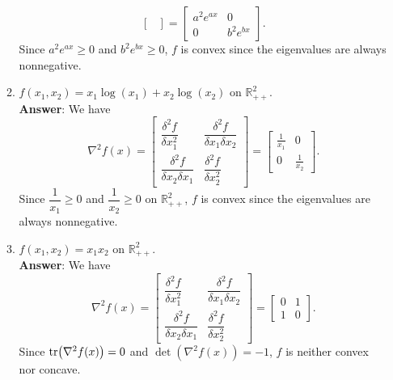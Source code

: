 \documentclass{article}
\begin{document}
\begin{enumerate}
\begin{enumerate}
\[\begin{bmatrix}
                              \end{bmatrix}=\begin{bmatrix}
                                    a^2e^{ax} & 0         \\
                                    0         & b^2e^{bx}
                              \end{bmatrix}.
                        \] Since $a^2e^{ax}\geq 0$ and $b^2e^{bx}\geq 0$, $f$ is convex since the eigenvalues are always nonnegative.
                  \item $f(x_1,x_2)=x_1\log(x_1)+x_2\log(x_2)$ on $\mathbb{R}_{++}^2$.\\
                        \textbf{Answer}: We have \[
                              \nabla^2 f(x)=\begin{bmatrix}
                                    \dfrac{\delta^2 f}{\delta x_1^2} & \dfrac{\delta^2 f}{\delta x_1\delta x_2} \\\dfrac{\delta^2 f}{\delta x_2\delta x_1}&\dfrac{\delta^2 f}{\delta x_2^2}
                              \end{bmatrix}=\begin{bmatrix}
                                    \frac{1}{x_1} & 0             \\
                                    0             & \frac{1}{x_2}
                              \end{bmatrix}.
                        \] Since $\dfrac{1}{x_1}\geq 0$ and $\dfrac{1}{x_2}\geq 0$ on $\mathbb{R}_{++}^2$, $f$ is convex since the eigenvalues are always nonnegative.
                  \item $f(x_1,x_2)=x_1x_2$ on $\mathbb{R}_{++}^2$.\\
                        \textbf{Answer}: We have \[
                              \nabla^2 f(x)=\begin{bmatrix}
                                    \dfrac{\delta^2 f}{\delta x_1^2} & \dfrac{\delta^2 f}{\delta x_1\delta x_2} \\\dfrac{\delta^2 f}{\delta x_2\delta x_1}&\dfrac{\delta^2 f}{\delta x_2^2}
                              \end{bmatrix}=\begin{bmatrix}
                                    0 & 1 \\
                                    1 & 0
                              \end{bmatrix}.
                        \] Since $\tr(\nabla^2 f(x))=0$ and $\det(\nabla^2 f(x))=-1$, $f$ is neither convex nor concave.

\end{enumerate}
\end{enumerate}
\end{document}

